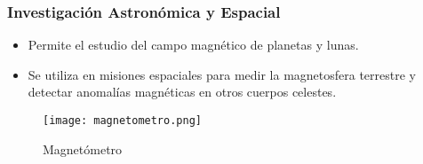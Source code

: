 \subsubsection{\textbf{Investigación Astronómica y Espacial}}
\begin{itemize}
	\item Permite el estudio del campo magnético de planetas y lunas.
	\item Se utiliza en misiones espaciales para medir la magnetosfera terrestre y detectar anomalías magnéticas en otros cuerpos celestes.
\end{itemize}
\begin{figure}[H]
	\centering
	\texttt{[image: magnetometro.png]}
	\caption{Magnetómetro}
\end{figure}
